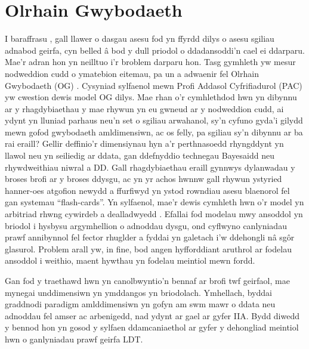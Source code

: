\section{Olrhain Gwybodaeth}
I baraffrasu \textcite{meara_complexities_1994}, gall llawer o dasgau asesu fod yn ffyrdd dilys o asesu sgiliau adnabod geirfa, cyn belled â bod y dull priodol o ddadansoddi'n cael ei ddarparu. Mae'r adran hon yn neilltuo i'r broblem darparu hon. Tasg gymhleth yw mesur nodweddion cudd o ymatebion eitemau, pa un a adwaenir fel Olrhain Gwybodaeth (OG) \parencite{shen_survey_2024}. Cysyniad sylfaenol mewn Profi Addasol Cyfrifiadurol (PAC) yw cwestion dewis model OG dilys. Mae rhan o'r cymhlethdod hwn yn dibynnu ar y rhagdybiaethau y mae rhywun yn eu gwneud ar y nodweddion cudd, ai ydynt yn lluniad parhaus neu'n set o sgiliau arwahanol, sy'n cyfuno gyda'i gilydd mewn gofod gwybodaeth amldimensiwn, ac os felly, pa sgiliau sy'n dibynnu ar ba rai eraill? Gellir deffinio'r dimensiynau hyn a'r perthnasoedd rhyngddynt yn llawol neu yn seiliedig ar ddata, gan ddefnyddio technegau Bayesaidd neu rhywdweithiau niwral a DD\@. Gall rhagdybiaethau eraill gynnwys dylanwadau y broses brofi ar y broses ddysgu, ac yn yr achos hwnnw gall rhywun ystyried hanner-oes atgofion newydd a ffurfiwyd yn ystod rowndiau asesu blaenorol fel gan systemau ``flash-cards''. Yn sylfaenol, mae'r dewis cymhleth hwn o'r model yn arbitriad rhwng cywirdeb a dealladwyedd \parencite{pelanek_adaptive_2025}. Efallai fod modelau mwy ansoddol yn briodol i hysbysu argymhellion o adnoddau dysgu, ond cyflwyno canlyniadau prawf annibynnol fel fector rhuglder a fyddai yn galetach i'w ddehongli nâ sgôr glasurol. Problem arall yw, in fine, bod angen hyfforddiant aruthrol ar fodelau ansoddol i weithio, maent hywthau yn fodelau meintiol mewn fordd.

Gan fod y traethawd hwn yn canolbwyntio'n bennaf ar brofi twf geirfaol, mae mynegai unddimensiwn yn ymddangos yn briodolach. Ymhellach, byddai graddnodi paradigm amlddimensiwn yn gofyn am swm mawr o ddata neu adnoddau fel amser ac arbenigedd, nad ydynt ar gael ar gyfer IIA\@. Bydd diwedd y bennod hon yn gosod y sylfaen ddamcaniaethol ar gyfer y dehongliad meintiol hwn o ganlyniadau prawf geirfa LDT\@.


